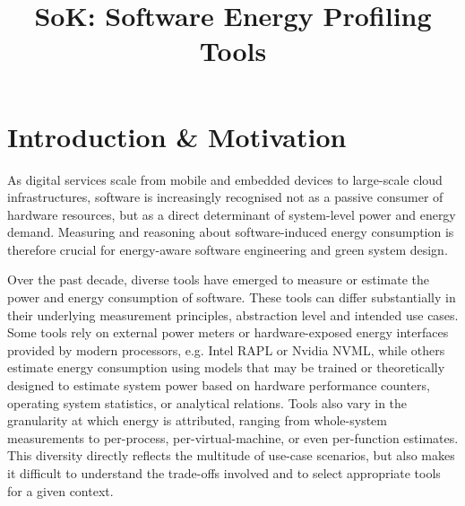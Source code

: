 \documentclass[
  acmsmall,
  screen,
  review,
  xcolor={dvipsnames,usenames}
]{acmart}
\begin{document}
\title{SoK: Software Energy Profiling Tools}





\begin{abstract}

\end{abstract}


\maketitle

\section{Introduction \& Motivation}

As digital services scale from mobile and embedded devices to large-scale cloud infrastructures, software is increasingly recognised not as a passive consumer of hardware resources, but as a direct determinant of system-level power and energy demand. Measuring and reasoning about software-induced energy consumption is therefore crucial for energy-aware software engineering and green system design.


Over the past decade, diverse tools have emerged to measure or estimate the power and energy consumption of software. These tools can differ substantially in their underlying measurement principles, abstraction level and intended use cases. Some tools rely on external power meters or hardware-exposed energy interfaces provided by modern processors, e.g. Intel RAPL or Nvidia NVML, while others estimate energy consumption using models that may be trained or theoretically designed to estimate system power based on hardware performance counters, operating system statistics, or analytical relations. Tools also vary in the granularity at which energy is attributed, ranging from whole-system measurements to per-process, per-virtual-machine, or even per-function estimates. This diversity directly reflects the multitude of use-case scenarios, but also makes it difficult to understand the trade-offs involved and to select appropriate tools for a given context.
\end{document}
